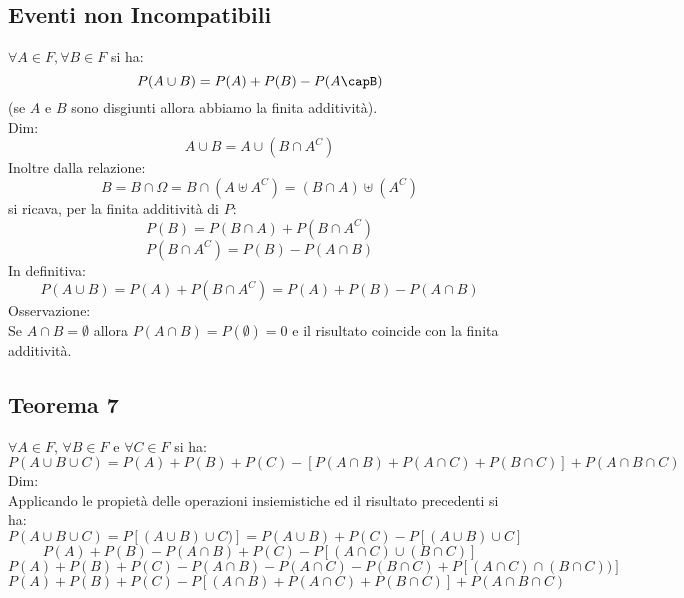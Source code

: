 \subsection{Eventi non Incompatibili}
$ \forall A \in F, \forall B \in F $ si ha:
$$ P(A \cup B) = P(A) + P(B) - P(A\capB)$$
(se $A$ e $B$ sono disgiunti allora abbiamo la finita additività).\\
Dim: 
$$ A \cup B = A \cup (B \cap A^C) $$
Inoltre dalla relazione:
$$ B=B \cap \Omega = B \cap (A \uplus A^C) = (B \cap A) \uplus (A^C)$$
si ricava, per la finita additività di $P$:
$$ P(B) = P(B \cap A) + P(B \cap A^C)$$
$$ P(B \cap A^C) = P(B) - P(A \cap B)$$
In definitiva:
$$ P(A \cup B) = P(A) + P(B \cap A^C) = P(A) + P(B) - P(A \cap B)$$
Osservazione:\\
Se $A \cap B = \emptyset$ allora $P(A \cap B) = P(\emptyset) = 0$ e il risultato coincide con la finita additività.

\subsection{Teorema 7}
$\forall A \in F$, $\forall B \in F$ e $\forall C \in F$ si ha:
$$ P(A \cup B \cup C) = P(A) + P(B) + P(C) - [P(A \cap B) + P(A \cap C) + P(B \cap C)] + P(A \cap B \cap C)$$
Dim: \\
Applicando le propietà delle operazioni insiemistiche ed il risultato precedenti si ha:
$$ P(A \cup B \cup C) = P[(A \cup B) \cup C)] = P(A \cup B) + P(C) - P[(A \cup B) \cup C]$$
$$ P(A) + P(B) - P(A \cap B) + P(C) - P[(A \cap C) \cup (B \cap C)]$$
$$ P(A) + P(B) + P(C) - P(A \cap B) - P(A \cap C) - P(B \cap C) + P[(A \cap C) \cap (B \cap C))]$$
$$ P(A) + P(B) +P(C) - P[(A \cap B) + P (A \cap C) + P(B \cap C)] + P(A \cap B \cap C)$$
